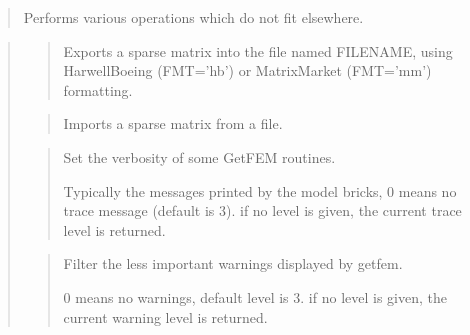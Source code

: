 \documentclass[a4paper,11pt,english]{sphinxmanual}
\begin{document}
\begin{sphinxVerbatim}[commandchars=\\\{\}]
      
      
   \PYG{p}{[}  \PYG{p}{]}
    
\end{sphinxVerbatim}

\begin{quote}

Performs various operations which do not fit elsewhere.
\end{quote}

\begin{quote}

\begin{quote}

Exports a sparse matrix into the file named FILENAME, using
Harwell\sphinxhyphen{}Boeing (FMT=’hb’) or Matrix\sphinxhyphen{}Market (FMT=’mm’) formatting.
\end{quote}

\begin{quote}

Imports a sparse matrix from a file.
\end{quote}

\begin{quote}

Set the verbosity of some GetFEM routines.

Typically the messages printed by the model bricks, 0 means no
trace message (default is 3). if no level is given,
the current trace level is returned.
\end{quote}

\begin{quote}

Filter the less important warnings displayed by getfem.

0 means no warnings, default level is 3. if no level is given,
the current warning level is returned.
\end{quote}
\end{quote}
\end{document}
